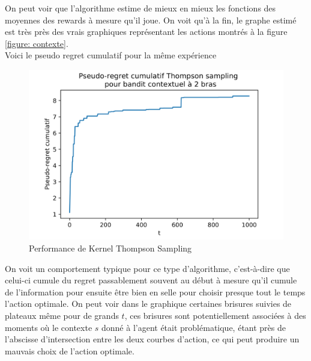 \documentclass[letterpaper,11pt]{article}
\begin{document}
On peut voir que l'algorithme estime de mieux en mieux les fonctions des moyennes des rewards à mesure qu'il joue. On voit qu'à la fin, le graphe estimé est très près des vrais graphiques représentant les actions montrés à la figure \ref{figure: contexte}.\\

Voici le pseudo regret cumulatif pour la même expérience

\begin{figure}[H]
\label{figure: pseudo KTS}
\caption{Performance de Kernel Thompson Sampling}
\begin{center}
\includegraphics[scale=0.2]{pseudo-KTS.png}
\end{center}
\end{figure}

On voit un comportement typique pour ce type d'algorithme, c'est-à-dire que celui-ci cumule du regret passablement souvent au début à mesure qu'il cumule de l'information pour ensuite être bien en selle pour choisir presque tout le temps l'action optimale. On peut voir dans le graphique certaines brisures suivies de plateaux même pour de grands $t$, ces brisures sont potentiellement associées à des moments où le contexte $s$ donné à l'agent était problématique, étant près de l'abscisse d'intersection entre les deux courbes d'action, ce qui peut produire un mauvais choix de l'action optimale. 
\end{document}
